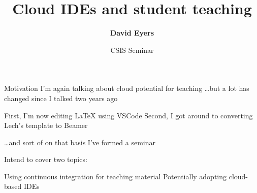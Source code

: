 \documentclass[aspectratio=169,t]{beamer}
\title[2022-05-??---CSIS Seminar]{Cloud IDEs and student teaching}
\date{CSIS Seminar}
\author{\textbf{David Eyers}}
\begin{document}
\begin{frame}
  \titlepage
\end{frame}

\begin{dframe}{Motivation}
  \1 I'm again talking about cloud potential for teaching
  \2 \dots but a lot has changed since I talked two years ago


  \3 First, I'm now editing \LaTeX{} using VSCode
  \3 Second, I got around to converting Lech's template to Beamer

  \3 \dots and sort of on that basis I've formed a seminar

  \bigskip

  \1 Intend to cover two topics:

  \2 Using continuous integration for teaching material
  \2 Potentially adopting cloud-based IDEs

\end{dframe}
\end{document}
